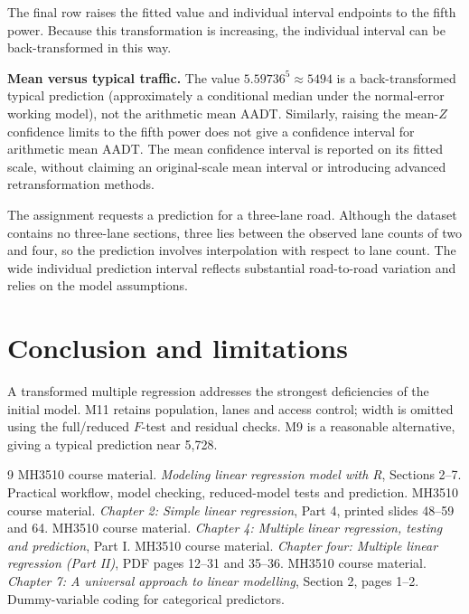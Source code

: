 \documentclass[11pt,a4paper]{article}
\begin{document}
The final row raises the fitted value and individual interval endpoints to the
fifth power. Because this transformation is increasing, the individual interval
can be back-transformed in this way.

\textbf{Mean versus typical traffic.} The value $5.59736^5\approx5494$ is a
back-transformed typical prediction (approximately a conditional median under
the normal-error working model), not the arithmetic mean AADT.
Similarly, raising the mean-$Z$ confidence limits to the fifth power does not
give a confidence interval for arithmetic mean AADT. The mean confidence
interval is reported on its fitted scale, without claiming an original-scale
mean interval or introducing advanced retransformation methods.

The assignment requests a prediction for a three-lane road. Although the dataset
contains no three-lane sections, three lies between the observed lane counts of
two and four, so the prediction involves interpolation with respect to lane count.
The wide individual prediction interval reflects
substantial road-to-road variation and relies on the model assumptions.

\section{Conclusion and limitations}
A transformed multiple regression addresses the strongest deficiencies of the
initial model. M11 retains population, lanes and access control; width is omitted
using the full/reduced $F$-test and residual checks. M9 is a reasonable alternative,
giving a typical prediction near 5,728.

\begin{minipage}{\linewidth}
\begin{thebibliography}{9}
 MH3510 course material.
\emph{Modeling linear regression model with R}, Sections 2--7.
Practical workflow, model checking, reduced-model tests and prediction.
 MH3510 course material.
\emph{Chapter 2: Simple linear regression}, Part 4, printed slides 48--59 and 64.
 MH3510 course material.
\emph{Chapter 4: Multiple linear regression, testing and prediction}, Part I.
 MH3510 course material.
\emph{Chapter four: Multiple linear regression (Part II)}, PDF pages 12--31
and 35--36.
 MH3510 course material.
\emph{Chapter 7: A universal approach to linear modelling}, Section 2, pages 1--2.
Dummy-variable coding for categorical predictors.
\end{thebibliography}
\end{minipage}
\end{document}
